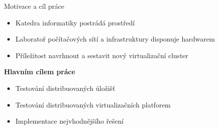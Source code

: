 \begin{frame}{Motivace a cíl práce}
\begin{itemize}
 \item Katedra informatiky postrádá prostředí
 \item Laboratoř počítačových sítí a infrastruktury disponuje hardwarem
 \item Příležitost navrhnout a sestavit nový virtualizační cluster
\end{itemize}
\vspace{0.25cm}
\textbf{Hlavním cílem práce}
\begin{itemize}
 \item Testování distribuovaných úložišť 
 \item Testování distribuovaných virtualizačních platforem
 \item Implementace nejvhodnějšího řešení
\end{itemize}
\end{frame}
